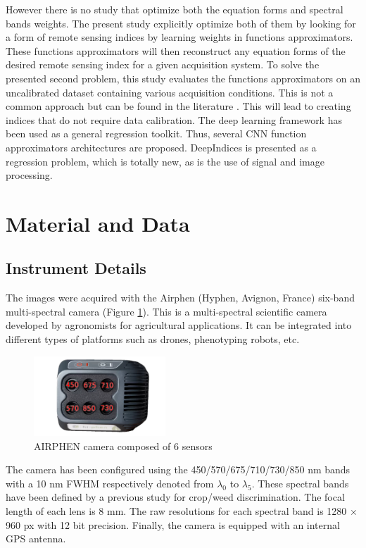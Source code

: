 \documentclass[../thesis.tex]{subfiles}
\begin{document}
	However there is no study that optimize both the equation forms and spectral bands weights. The present study explicitly optimize both of them by looking for a form of remote sensing indices by learning weights in functions approximators. These functions approximators will then reconstruct any equation forms of the desired remote sensing index for a given acquisition system. 
	To solve the presented second problem, this study evaluates the functions approximators on an uncalibrated dataset containing various acquisition conditions. This is not a common approach but can be found in the literature \cite{Bajwa2002, Bareth2016}. This will lead to creating indices that do not require data calibration. The deep learning framework has been used as a general regression toolkit. Thus, several CNN function approximators architectures are proposed. DeepIndices is presented as a regression problem, which is totally new, as is the use of signal and image processing.
	
	\newpage
	\section{Material and Data}
	\label{sec:mat-data}
	
	
	\subsection{Instrument Details}
	The images were acquired with the Airphen (Hyphen, Avignon, France) six-band multi-spectral camera (Figure \ref{fig:camera}). This is a multi-spectral scientific camera developed by agronomists for agricultural applications. It can be integrated into different types of platforms such as drones, phenotyping robots, etc.
	
	\begin{figure}[H]
		\centering
		\includegraphics[height=3cm]{img/idx/airphen-detail4}
		\caption{AIRPHEN camera composed of 6 sensors}
		\label{fig:camera}
	\end{figure}
	
	
	The camera has been configured using the 450/570/675/710/730/850 nm bands with a 10 nm FWHM respectively denoted from $\lambda_{0}$ to $\lambda_{5}$. These spectral bands have been defined by a previous study \cite{Louargant2017} for crop/weed discrimination.
	The focal length of each lens is 8 mm. The raw resolutions for each spectral band is 1280  $\times$ 960 px with 12 bit precision. Finally, the camera is equipped with an internal GPS antenna.
	
\end{document}
